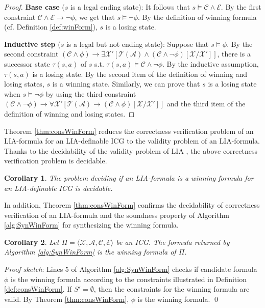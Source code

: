 \documentclass[review]{elsarticle}
\newcommand{\set}[1]{\{ #1 \}}
\newcommand{\tuple}[1]{\langle {#1} \rangle}
\newcommand{\statevar}{\mathcal{X}}
\newcommand{\winSet}{\mathcal{W}}
\newcommand{\act}{\mathcal{A}}
\newcommand{\trans}{\mathcal{T}}
\newcommand{\constraint}{\mathcal{C}}
\newcommand{\estate}{\mathcal{E}}
\newenvironment{proofsketch}{\textit{Proof sketch}:}{\qed}
\newtheorem{corollary}{Corollary}
\begin{document}
\begin{proof}
		\textbf{Base case} ($s$ is a legal ending state): 
		It follows that $s \models \constraint \land \estate$.	
		By the first constraint $\constraint \land \estate \rightarrow \neg \phi$, we get that $s \models \neg \phi$.
		By the definition of winning formula (cf. Definition \ref{def:winForm}), $s$ is a losing state.
		
		\textbf{Inductive step} ($s$ is a legal but not ending state):
		Suppose that $s \models \phi$.
		By the second constraint $(\constraint \land \phi) \rightarrow \exists \statevar' [\trans(\act) \land (\constraint \land \neg \phi)[\statevar/\statevar']]$, there is a successor state $\tau(s, a)$ of $s$ s.t. $\tau(s, a) \models \constraint \land \neg \phi$.
		By the inductive assumption, $\tau(s, a)$ is a losing state.
		By the second item of the definition of winning and losing states, $s$ is a winning state.
		Similarly, we can prove that $s$ is a losing state when $s \models \neg \phi$ by using the third constraint $(\constraint \land \neg \phi) \rightarrow \forall \statevar' [\trans(\act) \rightarrow (\constraint \land \phi)[\statevar/\statevar']]$ and the third item of the definition of winning and losing states.
%		
	\end{proof}
	
	Theorem \ref{thm:consWinForm} reduces the correctness verification problem of an LIA-formula for an LIA-definable ICG to the validity problem of an LIA-formula.
	Thanks to the decidability of the validity problem of LIA \cite{Pre1929}, the above correctness verification problem is decidable.
	\begin{corollary}
		The problem deciding if an LIA-formula is a winning formula for an LIA-definable ICG is decidable.
	\end{corollary}
	
	
	In addition, Theorem \ref{thm:consWinForm} confirms the decidability of correctness verification of an LIA-formula and the soundness property of Algorithm \ref{alg:SynWinForm} for synthesizing the winning formula.
	\begin{corollary} \label{cor:winForm}
		Let $\Pi = \tuple{\statevar, \act, \constraint, \estate}$ be an ICG.
		The formula returned by Algorithm \ref{alg:SynWinForm} is the winning formula of $\Pi$.
	\end{corollary}	
	\begin{proofsketch}
		Lines 5 of Algorithm \ref{alg:SynWinForm} checks if candidate formula $\phi$ is the winning formula according to the constraints illustrated in Definition \ref{def:consWinForm}.
		If $S' = \emptyset$, then the constraints for the winning formula are valid.
		By Theorem \ref{thm:consWinForm}, $\phi$ is the winning formula.
	\end{proofsketch}
	
\end{document}

